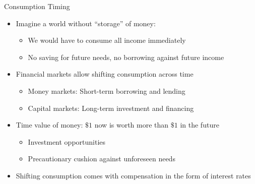 \documentclass[10pt]{beamer}
\begin{document}
\begin{frame}{Consumption Timing}
  \begin{itemize}[<+->]
    \item Imagine a world without ``storage'' of money: 
      \begin{itemize}
        \item We would have to consume all income immediately
        \item No saving for future needs, no borrowing against future income
      \end{itemize}
    \item Financial markets allow shifting consumption across time
      \begin{itemize}
        \item Money markets: Short-term borrowing and lending
        \item Capital markets: Long-term investment and financing
      \end{itemize}
    \item Time value of money: $\$1$ now is worth more than $\$1$ in the future
      \begin{itemize}
        \item Investment opportunities
        \item Precautionary cushion against unforeseen needs
      \end{itemize}
    \item Shifting consumption comes with compensation in the form of interest rates
  \end{itemize}
\end{frame}
\end{document}
